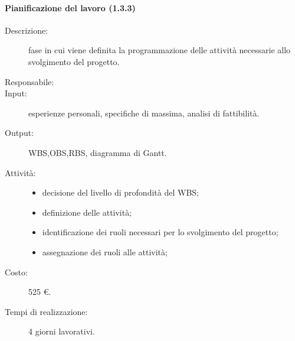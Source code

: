 \paragraph{Pianificazione del lavoro (1.3.3)}
\begin{description}
\item[Descrizione:] fase in cui viene definita la programmazione delle attivit\`{a} necessarie allo svolgimento del progetto.
\item[Responsabile:] 
\item[Input:] esperienze personali, specifiche di massima, analisi di fattibilit\`{a}.
\item[Output:] WBS,OBS,RBS, diagramma di Gantt.
\item[Attivit\`{a}:] 
\begin{center}
\begin{itemize}
\item decisione del livello di profondit\`{a} del WBS;
\item definizione delle attivit\`{a};
\item identificazione dei ruoli necessari per lo svolgimento del progetto;
\item assegnazione dei ruoli alle attivit\`{a};
\end{itemize}
\end{center}
\item[Costo:] 525 \euro{}.
\item[Tempi di realizzazione:] 4 giorni lavorativi.
\end{description}

